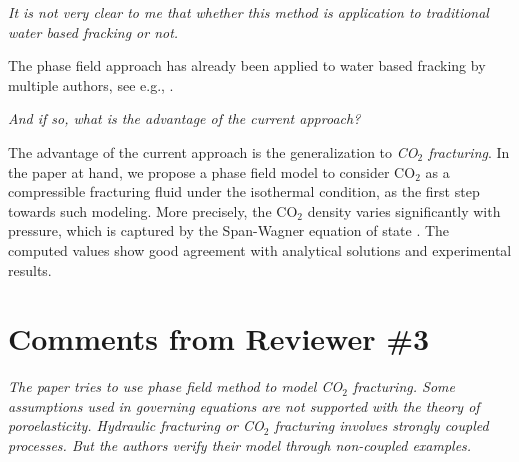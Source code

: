 \documentclass{elsarticle}
\newcommand{\review}[1]{ \textit{#1}}
\begin{document}
{{\bigskip

\review{It is not very clear to me that whether this method is application to traditional water based fracking or not. }

The phase field approach has already been applied to water based fracking by multiple authors, see e.g., \cite{bourdin2012variational, mikelic2014phase, yoshioka2016variational, wick2016fluid, mauthe2017hydraulic, ehlers2017phase, culp2017phase, heider2017modelling}. 

\bigskip
\review{And if so, what is the advantage of the current approach?}

The advantage of the current approach is the generalization to \emph{CO$_2$ fracturing}. 
In the paper at hand, we propose a phase field model to consider CO$_2$ as a compressible fracturing fluid under the isothermal condition, as the first step towards such modeling. More precisely, the CO$_2$ density varies significantly with pressure, which is captured by the Span-Wagner equation of state \cite{span1996new}. The computed values show good agreement with analytical solutions and experimental results.

\section*{Comments from Reviewer \#3}

    \review{The paper tries to use phase field method to model CO$_2$ fracturing. Some assumptions used in governing equations are not supported with the theory of poroelasticity. Hydraulic fracturing or CO$_2$ fracturing involves strongly coupled processes. But the authors verify their model through non-coupled examples.}

}}
\end{document}
